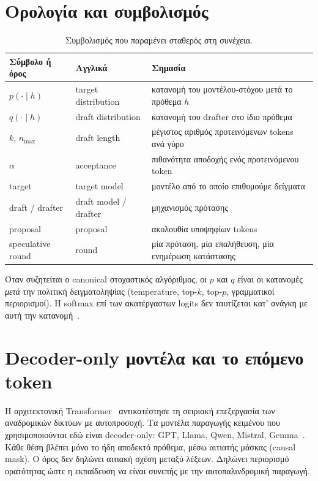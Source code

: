 \documentclass[a4paper,12pt]{report}
\theoremstyle{plain}
\theoremstyle{definition}
\theoremstyle{remark}
\begin{document}
\section{Ορολογία και συμβολισμός}
\label{sec:terminology}

\begin{table}[ht]
  \centering
  \caption{Συμβολισμός που παραμένει σταθερός στη συνέχεια.}
  \label{tab:notation}
  \small
  \begin{tabular}{@{}llp{7.4cm}@{}}
    \toprule
    Σύμβολο ή όρος      & Αγγλικά               & Σημασία
    \\
    \midrule
    \(p(\cdot\mid h)\)  & target distribution   & κατανομή του
    μοντέλου-στόχου μετά το πρόθεμα \(h\)
    \\
    \(q(\cdot\mid h)\)  & draft distribution    & κατανομή του drafter
    στο ίδιο πρόθεμα
    \\
    \(k\), \(n_{\max}\) & draft length          & μέγιστος αριθμός
    προτεινόμενων tokens ανά γύρο
    \\
    \(\alpha\)          & acceptance            & πιθανότητα αποδοχής
    ενός προτεινόμενου token \\
    target              & target model          & μοντέλο από το
    οποίο επιθυμούμε δείγματα     \\
    draft / drafter     & draft model / drafter & μηχανισμός πρότασης
    \\
    proposal            & proposal              & ακολουθία υποψηφίων
    tokens                   \\
    speculative round   & round                 & μία πρόταση, μία
    επαλήθευση, μία
    ενημέρωση κατάστασης
    \\
    \bottomrule
  \end{tabular}
\end{table}

Όταν συζητείται ο canonical στοχαστικός αλγόριθμος, οι \(p\) και \(q\) είναι
οι κατανομές \emph{μετά} την πολιτική δειγματοληψίας (temperature, top-\(k\),
top-\(p\), γραμματικοί περιορισμοί). Η softmax επί των ακατέργαστων logits δεν
ταυτίζεται κατ' ανάγκη με αυτή την κατανομή~\cite{holtzman2020curious}.

\section{Decoder-only μοντέλα και το επόμενο token}

Η αρχιτεκτονική Transformer~\cite{vaswani2017attention} αντικατέστησε τη
σειριακή επεξεργασία των αναδρομικών δικτύων με αυτοπροσοχή. Τα μοντέλα
παραγωγής κειμένου που χρησιμοποιούνται εδώ είναι decoder-only: GPT,
Llama, Qwen, Mistral,
Gemma~\cite{brown2020language,touvron2023llama,qwen2p5,jiang2023mistral,gemma2024}.
Κάθε θέση βλέπει μόνο το ήδη αποδεκτό πρόθεμα, μέσω αιτιατής μάσκας
(causal mask). Ο όρος δεν δηλώνει αιτιακή σχέση μεταξύ λέξεων. Δηλώνει
περιορισμό ορατότητας ώστε η εκπαίδευση να είναι συνεπής με την
αυτοπαλινδρομική παραγωγή.
\end{document}
